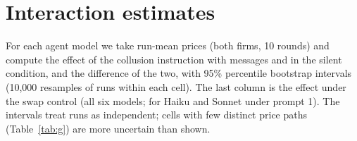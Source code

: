 \documentclass[10pt]{article}
\begin{document}
\section{Interaction estimates}\label{app:inter}
For each agent model we take run-mean prices (both firms, 10 rounds) and compute the effect of the collusion instruction with messages and in the silent condition, and the difference of the two, with 95\% percentile bootstrap intervals (10{,}000 resamples of runs within each cell). The last column is the effect under the swap control (all six models; for Haiku and Sonnet under prompt 1). The intervals treat runs as independent; cells with few distinct price paths (Table~\ref{tab:g}) are more uncertain than shown.
\begin{table}[h]\centering\small
\resizebox{\linewidth}{!}{}
\caption{Effect of the collusion instruction on the run-mean price (collude minus honest), by condition, with 95\% bootstrap CI.}\label{tab:i}\end{table}
\end{document}
